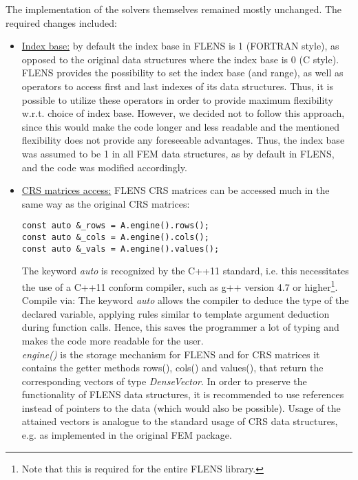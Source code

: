 The implementation of the solvers themselves remained mostly unchanged. The required changes included:
\begin{itemize}
\item \underline{Index base:} by default the index base in FLENS is 1 (FORTRAN style), as opposed to the original data structures where the index base is 0 (C style). FLENS provides the possibility to set the index base (and range), as well as operators to access first and last indexes of its data structures. Thus, it is possible to utilize these operators in order to provide maximum flexibility w.r.t. choice of index base. However, we decided not to follow this approach, since this would make the code longer and less readable and the mentioned flexibility does not provide any foreseeable advantages. Thus, the index base was assumed to be 1 in all FEM data structures, as by default in FLENS, and the code was modified accordingly. 

\item \underline{CRS matrices access:} FLENS CRS matrices can be accessed much in the same way as the original CRS matrices:
\begin{lstlisting}
const auto &_rows = A.engine().rows();
const auto &_cols = A.engine().cols();
const auto &_vals = A.engine().values();
\end{lstlisting}
The keyword \emph{auto} is recognized by the C++11 standard, i.e. this necessitates the use of a C++11 conform compiler, such as g++ version 4.7 or higher\footnote{Note that this is required for the entire FLENS library.}. Compile via:
The keyword \emph{auto} allows the compiler to deduce the type of the declared variable, applying rules similar to template argument deduction during function calls. Hence, this saves the programmer a lot of typing and makes the code more readable for the user.\\
\emph{engine()} is the storage mechanism for FLENS and for CRS matrices it contains the getter methods rows(), cols() and values(), that return the corresponding vectors of type \emph{DenseVector}. In order to preserve the functionality of FLENS data structures, it is recommended to use references instead of pointers to the data (which would also be possible). Usage of the attained vectors is analogue to the standard usage of CRS data structures, e.g. as implemented in the original FEM package.


\end{itemize}
